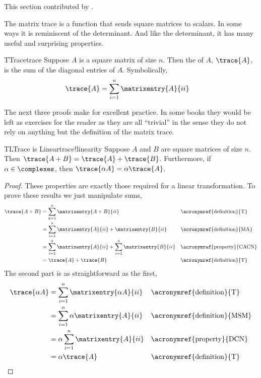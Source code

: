 
This section contributed by \andyzimmer.\par\bigskip
%
The matrix trace is a function that sends square matrices to scalars.  In some ways it is reminiscent of the determinant.  And like the determinant, it has many useful and surprising properties.
%
\begin{definition}{T}{Trace}{trace}
Suppose $A$ is a square matrix of size $n$.  Then the  of $A$, $\trace{A}$, is the sum of the diagonal entries of $A$.  Symbolically,
%
\begin{align*}
\trace{A}
&=\sum_{i=1}^n \matrixentry{A}{ii}
\end{align*}
\end{definition}
%
The next three proofs make for excellent practice.  In some books they would be left as exercises for the reader as they are all ``trivial'' in the sense they do not rely on anything but the definition of the matrix trace.
%
\begin{theorem}{TL}{Trace is Linear}{trace!linearity}
Suppose $A$ and $B$ are square matrices of size $n$.  Then $\trace{A+B}=\trace{A}+\trace{B}$.  Furthermore, if $\alpha\in\complexes$, then $\trace{\alpha A}=\alpha\trace{A}$.
\end{theorem}
%
\begin{proof}
These properties are exactly those required for a linear transformation.  To prove these results we just manipulate sums,
%
\begin{align*}
\trace{A+B}
&=\sum_{k=1}^n \matrixentry{A+B}{ii}&&\text{\acronymref{definition}{T}}\\
&=\sum_{i=1}^n \matrixentry{A}{ii}+\matrixentry{B}{ii}&&\text{\acronymref{definition}{MA}}\\
&=\sum_{i=1}^n \matrixentry{A}{ii}+\sum_{i=1}^n \matrixentry{B}{ii}&&\text{\acronymref{property}{CACN}}\\
&=\trace{A}+\trace{B}&&\text{\acronymref{definition}{T}}
\end{align*}
%
The second part is as straightforward as the first,
%
\begin{align*}
\trace{\alpha A}
&=\sum_{i=1}^n \matrixentry{\alpha A}{ii}&&\text{\acronymref{definition}{T}}\\
&=\sum_{i=1}^n \alpha \matrixentry{A}{ii}&&\text{\acronymref{definition}{MSM}}\\
&=\alpha \sum_{i=1}^n \matrixentry{A}{ii}&&\text{\acronymref{property}{DCN}}\\
&=\alpha\trace{A}&&\text{\acronymref{definition}{T}}
\end{align*}
%
\end{proof}
